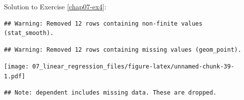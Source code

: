 \documentclass[
  12pt,
  krantz2]{krantz}
\makeatletter
\newenvironment{Shaded}{\begin{snugshade}}{\end{snugshade}}
\newcommand{\CommentTok}[1]{\textcolor[rgb]{0.56,0.35,0.01}{\textit{#1}}}
\newcommand{\DataTypeTok}[1]{\textcolor[rgb]{0.13,0.29,0.53}{#1}}
\newcommand{\KeywordTok}[1]{\textcolor[rgb]{0.13,0.29,0.53}{\textbf{#1}}}
\newcommand{\NormalTok}[1]{#1}
\newcommand{\OperatorTok}[1]{\textcolor[rgb]{0.81,0.36,0.00}{\textbf{#1}}}
\newcommand{\OtherTok}[1]{\textcolor[rgb]{0.56,0.35,0.01}{#1}}
\newcommand{\StringTok}[1]{\textcolor[rgb]{0.31,0.60,0.02}{#1}}
\newenvironment{kframe}{%
\medskip{}
\setlength{\fboxsep}{.8em}
 \def\at@end@of@kframe{}%
 \ifinner\ifhmode%
  \def\at@end@of@kframe{\end{minipage}}%
  \begin{minipage}{\columnwidth}%
 \fi\fi%
 \def\FrameCommand##1{\hskip\@totalleftmargin \hskip-\fboxsep
 \colorbox{shadecolor}{##1}\hskip-\fboxsep
     \hskip-\linewidth \hskip-\@totalleftmargin \hskip\columnwidth}%
 \MakeFramed {\advance\hsize-\width
   \@totalleftmargin\z@ \linewidth\hsize
   \@setminipage}}%
 {\par\unskip\endMakeFramed%
 \at@end@of@kframe}
\renewenvironment{Shaded}{\begin{kframe}}{\end{kframe}}
\makeatother
\begin{document}
Solution to Exercise \ref{chap07-ex4}:

\begin{Shaded}
\end{Shaded}

\begin{verbatim}
## Warning: Removed 12 rows containing non-finite values (stat_smooth).
\end{verbatim}

\begin{verbatim}
## Warning: Removed 12 rows containing missing values (geom_point).
\end{verbatim}

\texttt{[image: 07\_linear\_regression\_files/figure-latex/unnamed-chunk-39-1.pdf]}

\begin{Shaded}
\end{Shaded}

\begin{verbatim}
## Note: dependent includes missing data. These are dropped.
\end{verbatim}
\end{document}
